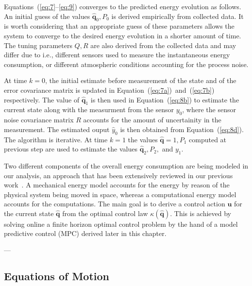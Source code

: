 \documentclass[letterpaper,10pt,conference]{ieeeconf}
\begin{document}
Equations~(\ref{eq:7}--\ref{eq:9}) converges to the predicted energy evolution as follows. An initial guess of the values $\hat{\mathbf{q}}_0,P_0$ is derived empirically from collected data. It is worth considering that an appropriate guess of these parameters allows the system to converge to the desired energy evolution in a shorter amount of time. The tuning parameters $Q,R$ are also derived from the collected data and may differ due to i.e., different sensors used to measure the instantaneous energy consumption, or different atmospheric conditions accounting for the process noise.

At time $k=0$, the initial estimate before measurement of the state and of the error covariance matrix is updated in Equation~(\ref{eq:7a})~and~(\ref{eq:7b}) respectively. The value of $\hat{\mathbf{q}}_1$ is then used in Equation~(\ref{eq:8b}) to estimate the current state along with the measurment from the sensor $y_0$, where the sensor noise covariance matrix $R$ accounts for the amount of uncertainity in the measurement. The estimated ouput $\hat{y}_0$ is then obtained from Equation~(\ref{eq:8d}). The algorithm is iterative. At time $k=1$ the values $\hat{\mathbf{q}}=1,P_1$ computed at previous step are used to estimate the values $\hat{\mathbf{q}}_2,P_2,$ and $y_1$.

Two different components of the overall energy consumption are being modeled in our analysis, an approach that has been extensively reviewed in our previous work~\cite{seewald2019coarse, seewald2019component, seewald2020mechanical, seewald2020towards}. A mechanical energy model accounts for the energy by reason of the physical system being moved in space, whereas a computational energy model accounts for the computations. The main goal is to derive a control action $\mathbf{u}$ for the current state $\hat{\mathbf{q}}$ from the optimal control law $\kappa(\hat{\mathbf{q}})$. This is achieved by solving online a finite horizon optimal control problem by the hand of a model predictive control (MPC) derived later in this chapter.

\noindent---

\subsection{Equations of Motion}
\end{document}
